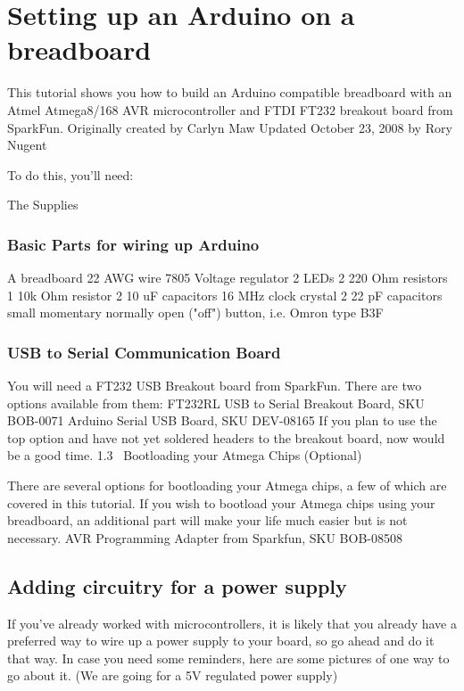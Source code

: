 \chapter{Setting up an Arduino on a breadboard}

This tutorial shows you how to build an Arduino compatible breadboard with an Atmel Atmega8/168 AVR microcontroller and FTDI FT232 breakout board from SparkFun.
Originally created by Carlyn Maw
Updated October 23, 2008 by Rory Nugent

To do this, you'll need:

The Supplies

\subsection{Basic Parts for wiring up Arduino}

A breadboard
22 AWG wire
7805 Voltage regulator
2 LEDs
2 220 Ohm resistors
1 10k Ohm resistor
2 10 uF capacitors
16 MHz clock crystal
2 22 pF capacitors
small momentary normally open ("off") button, i.e. Omron type B3F

\subsection{USB to Serial Communication Board}

You will need a FT232 USB Breakout board from SparkFun.
There are two options available from them:
FT232RL USB to Serial Breakout Board, SKU BOB-0071
Arduino Serial USB Board, SKU DEV-08165
If you plan to use the top option and have not yet soldered headers to the breakout board, now would be a good time.
1.3  Bootloading your Atmega Chips (Optional)

There are several options for bootloading your Atmega chips, a few of which are covered in this tutorial. If you wish to bootload your Atmega chips using your breadboard, an additional part will make your life much easier but is not necessary.
AVR Programming Adapter from Sparkfun, SKU BOB-08508

\section{Adding circuitry for a power supply}

If you've already worked with microcontrollers, it is likely that you already have a preferred way to wire up a power supply to your board, so go ahead and do it that way. In case you need some reminders, here are some pictures of one way to go about it. (We are going for a 5V regulated power supply)


